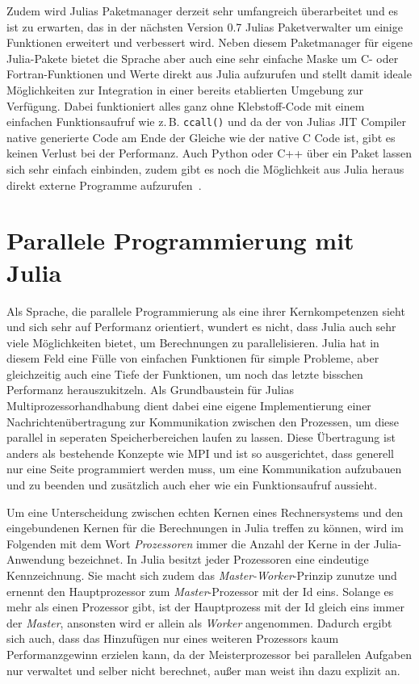 \documentclass[proseminar,german,utf8]{zihpub}
\newcommand{\zB}[0]{{z.\,B. }}
\begin{document}
Zudem wird Julias Paketmanager derzeit sehr umfangreich überarbeitet und es ist zu erwarten, das in der nächsten Version 0.7 Julias Paketverwalter um einige Funktionen erweitert und verbessert wird. Neben diesem Paketmanager für eigene Julia-Pakete bietet die Sprache aber auch eine sehr einfache Maske um C- oder Fortran-Funktionen und Werte direkt aus Julia aufzurufen und stellt damit ideale Möglichkeiten zur Integration in einer bereits etablierten Umgebung zur Verfügung. Dabei funktioniert alles ganz ohne Klebstoff-Code mit einem einfachen Funktionsaufruf wie \zB \verb|ccall()| und da der von Julias JIT Compiler native generierte Code am Ende der Gleiche wie der native C Code ist, gibt es keinen Verlust bei der Performanz. Auch Python oder C++ über ein Paket lassen sich sehr einfach einbinden, zudem gibt es noch die Möglichkeit aus Julia heraus direkt externe Programme aufzurufen~\cite{JuliaLangDocumentation}.

\section{Parallele Programmierung mit Julia}

Als Sprache, die parallele Programmierung als eine ihrer Kernkompetenzen sieht und sich sehr auf Performanz orientiert, wundert es nicht, dass Julia auch sehr viele Möglichkeiten bietet, um Berechnungen zu parallelisieren. Julia hat in diesem Feld eine Fülle von einfachen Funktionen für simple Probleme, aber gleichzeitig auch eine Tiefe der Funktionen, um noch das letzte bisschen Performanz herauszukitzeln. Als Grundbaustein für Julias Multiprozessorhandhabung dient dabei eine eigene Implementierung einer Nachrichtenübertragung zur Kommunikation zwischen den Prozessen, um diese parallel in seperaten Speicherbereichen laufen zu lassen. Diese Übertragung ist anders als bestehende Konzepte wie MPI und ist so ausgerichtet, dass generell nur eine Seite programmiert werden muss, um eine Kommunikation aufzubauen und zu beenden und zusätzlich auch eher wie ein Funktionsaufruf aussieht. 

Um eine Unterscheidung zwischen echten Kernen eines Rechnersystems und den eingebundenen Kernen für die Berechnungen in Julia treffen zu können, wird im Folgenden mit dem Wort \textit{Prozessoren} immer die Anzahl der Kerne in der Julia-Anwendung bezeichnet. In Julia besitzt jeder Prozessoren eine eindeutige Kennzeichnung. Sie macht sich zudem das \textit{Master-Worker}-Prinzip zunutze und ernennt den Hauptprozessor zum \textit{Master}-Prozessor mit der Id eins. Solange es mehr als einen Prozessor gibt, ist der Hauptprozess mit der Id gleich eins immer der \textit{Master}, ansonsten wird er allein als \textit{Worker} angenommen. Dadurch ergibt sich auch, dass das Hinzufügen nur eines weiteren Prozessors kaum Performanzgewinn erzielen kann, da der Meisterprozessor bei parallelen Aufgaben nur verwaltet und selber nicht berechnet, außer man weist ihn dazu explizit an. 
\end{document}
